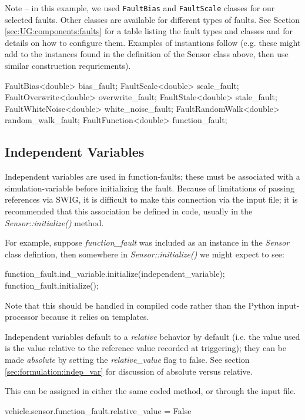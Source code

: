 \documentclass[11pt,fleqn]{report}
\begin{document}
Note -- in this example, we used \verb"FaultBias" and \verb"FaultScale" classes
for our selected faults. Other classes are available for different types of
faults.
See Section \ref{sec:UG:components:faults} for a table listing the fault types
and classes and for details on how to configure them. Examples of
instantions follow (e.g. these might add to the instances found in the
definition of the Sensor class above, then use similar construction
requriements).
\begin{codeC}
  FaultBias<double> bias_fault;
  FaultScale<double> scale_fault;
  FaultOverwrite<double> overwrite_fault;
  FaultStale<double> stale_fault;
  FaultWhiteNoise<double> white_noise_fault;
  FaultRandomWalk<double> random_walk_fault;
  FaultFunction<double> function_fault;
\end{codeC}

\subsection{Independent Variables}
Independent variables are used in function-faults; these must be associated with
a simulation-variable before initializing the fault. Because of limitations of
passing references via SWIG, it is difficult to make this connection via the
input file; it is recommended that this association be defined in code, usually
in the \textit{Sensor::initialize()} method.

For example, suppose \textit{function\_fault} was included as an instance
in the \textit{Sensor} class defintion, then somewhere in
\textit{Sensor::initialize()} we might expect to see:
\begin{codeC}
function_fault.ind_variable.initialize(independent_variable);
function_fault.initialize();
\end{codeC}
Note that this should be handled in compiled code rather than the Python
input-processor because it relies on templates.

Independent variables default to a \textit{relative} behavior by default
(i.e. the value used is the value relative to the reference value recorded at
triggering); they can be made \textit{absolute} by
setting the \textit{relative\_value} flag to false.
See section \ref{sec:formulation:indep_var} for discussion of absolute
versus relative.

This can be assigned in
either the same coded method, or through the input file.
\begin{codePython}
 vehicle.sensor.function_fault.relative_value = False
\end{codePython}
\end{document}
